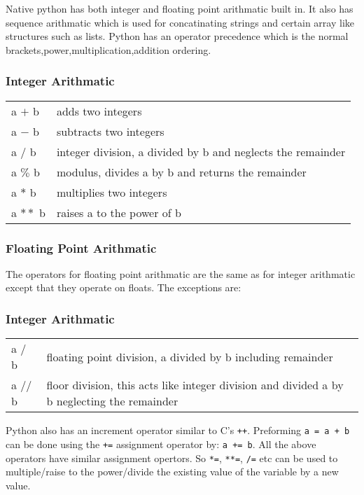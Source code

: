 \documentclass[11pt,a4paper]{article}
\begin{document}
Native python has both integer and floating point arithmatic built in. It also has sequence arithmatic which is used for concatinating strings and certain array like structures such as lists. Python has an operator precedence which is the normal brackets,power,multiplication,addition ordering.

\subsubsection{Integer Arithmatic}
\begin{center}
\begin{tabular}{l l}
a $+$ b & adds two integers \\
a $-$ b & subtracts two integers \\
a  $/$ b & integer division, a divided by b and neglects the remainder \\
a $\%$ b & modulus, divides a by b and returns the remainder \\
a $*$ b & multiplies two integers \\
a $**$ b & raises a to the power of b \\
\end{tabular}
\end{center}

\subsubsection{Floating Point Arithmatic}
The operators for floating point arithmatic are the same as
for integer arithmatic except that they operate on floats. The
exceptions are:

\subsubsection{Integer Arithmatic}
\begin{center}
\begin{tabular}{l l}
a $/$ b & \parbox[t]{10cm}{floating point division, a divided by b including remainder} \\
a $//$ b & \parbox[t]{10cm}{floor division, this acts like integer division and divided a by b neglecting the remainder} \\
\end{tabular}
\end{center}

Python also has an increment operator similar to C's \verb"++". Preforming \verb|a = a + b| can be done using the \verb|+=|  assignment operator by: \verb|a += b|. All the above operators have similar assignment opertors. So \verb|*=|, \verb|**=|, \verb|/=| etc can be used to multiple/raise to the power/divide the existing value of the variable by a new value. 
\end{document}

